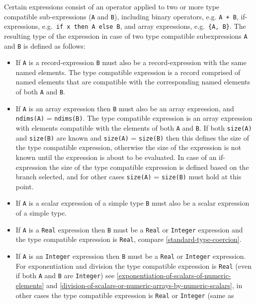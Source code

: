 Certain expressions consist of an operator applied to two or more type
compatible sub-expressions (\lstinline!A! and \lstinline!B!), including binary operators, e.g.
\lstinline!A + B!, if-expressions, e.g.\ \lstinline!if x then A else B!, and array expressions,
e.g.\ \lstinline!{A, B}!. The resulting type of the expression in case of two type
compatible subexpressions \lstinline!A! and \lstinline!B! is defined as follows:
\begin{itemize}
\item
  If \lstinline!A! is a record-expression \lstinline!B! must also be a record-expression with
  the same named elements. The type compatible expression is a record
  comprised of named elements that are compatible with the corresponding
  named elements of both \lstinline!A! and \lstinline!B!.
\item
  If \lstinline!A! is an array expression then \lstinline!B! must also be an array expression,
  and \lstinline!ndims(A)! = \lstinline!ndims(B)!. The type compatible expression is an array
  expression with elements compatible with the elements of both \lstinline!A! and \lstinline!B!.
  If both \lstinline!size(A)! and \lstinline!size(B)! are known
	and \lstinline!size(A)! = \lstinline!size(B)! then this
  defines the size of the type compatible expression, otherwise the size
  of the expression is not known until the expression is about to be
  evaluated. In case of an if-expression the size of the type compatible
  expression is defined based on the branch selected, and for other
  cases \lstinline!size(A)! = \lstinline!size(B)! must hold at this point.
\item
  If \lstinline!A! is a scalar expression of a simple type \lstinline!B! must also be a scalar
  expression of a simple type.
\item
  If \lstinline!A! is a \lstinline!Real! expression then \lstinline!B! must be a \lstinline!Real! or \lstinline!Integer! expression
  and the type compatible expression is \lstinline!Real!, compare \autoref{standard-type-coercion}.
\item
  If \lstinline!A! is an \lstinline!Integer! expression then \lstinline!B! must be a \lstinline!Real! or \lstinline!Integer!
  expression. For exponentiation and division the type compatible
  expression is \lstinline!Real! (even if both \lstinline!A! and \lstinline!B! are \lstinline!Integer!) see \autoref{exponentiation-of-scalars-of-numeric-elements}
  and \autoref{division-of-scalars-or-numeric-arrays-by-numeric-scalars}, in
  other cases the type compatible expression is \lstinline!Real! or \lstinline!Integer! (same as

\end{itemize}
